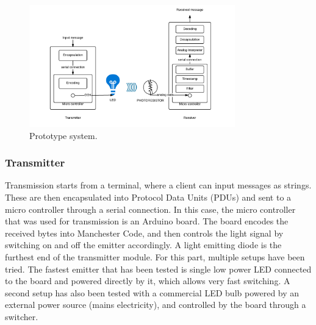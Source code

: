 \begin{figure}
\centering
\includegraphics[height=200px]{img/sysover}
\caption{Prototype system.}
\label{fig:sys over}
\end{figure}


\subsubsection{Transmitter}
Transmission starts from a terminal, where a client can input messages as strings. These are then encapsulated into Protocol Data Units (PDUs) and sent to a micro controller through a serial connection.
In this case, the micro controller that was used for transmission is an Arduino board.
The board encodes the received bytes into Manchester Code, and then controls the light signal by switching on and off the emitter accordingly.
A light emitting diode is the furthest end of the transmitter module.
For this part, multiple setups have been tried.
The fastest emitter that has been tested is single low power LED connected to the board and powered directly by it, which allows very fast switching.
A second setup has also been tested with a commercial LED bulb powered by an external power source (mains electricity), and controlled by the board through a switcher. 



